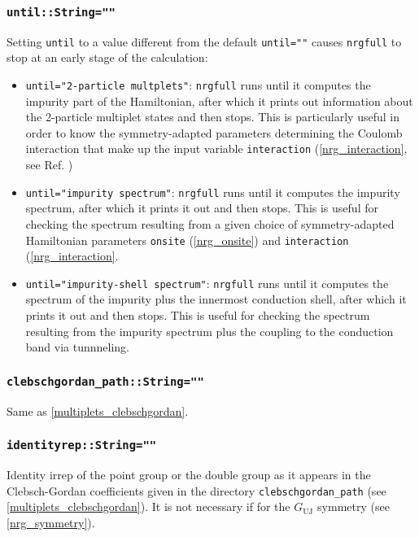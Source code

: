 \documentclass[notitlepage]{article}
\begin{document}
\subsubsection{\texttt{until::String=""}}
\label{nrg_until}
Setting \texttt{until} to a value different from the default
\texttt{until=""} causes \texttt{nrgfull} to stop at an
early stage of the calculation:
\begin{itemize}
    \item \texttt{until="2-particle multplets"}:
        \texttt{nrgfull} runs until it computes the impurity
        part of the Hamiltonian, after which it prints out
        information about the 2-particle multiplet states
        and then stops. This is particularly useful in order
        to know the symmetry-adapted parameters determining
        the Coulomb interaction that make up the input
        variable \texttt{interaction}
        (\ref{nrg_interaction}, see Ref.
        \cite{calvo-fernandez2024})
    \item \texttt{until="impurity spectrum"}:
        \texttt{nrgfull} runs until it computes the impurity
        spectrum, after which it prints it out and then
        stops. This is useful for checking the spectrum
        resulting from a given choice of symmetry-adapted
        Hamiltonian parameters \texttt{onsite}
        (\ref{nrg_onsite}) and \texttt{interaction}
        (\ref{nrg_interaction}.
    \item \texttt{until="impurity-shell spectrum"}:
        \texttt{nrgfull} runs until it computes the spectrum
        of the impurity plus the innermost conduction shell,
        after which it prints it out and then stops. This is
        useful for checking the spectrum resulting from the
        impurity spectrum plus the coupling to the
        conduction band via tunnneling.
\end{itemize}

\subsubsection{\texttt{clebschgordan\_path::String=""}}
Same as \ref{multiplets_clebschgordan}.

\subsubsection{\texttt{identityrep::String=""}}
\label{nrg_identityrep}
Identity irrep of the point group or the double group as it
appears in the Clebsch-Gordan coefficients given in the
directory \texttt{clebschgordan\_path} (see
\ref{multiplets_clebschgordan}). It is not necessary if for
the $G_\text{UJ}$ symmetry (see \ref{nrg_symmetry}).
\end{document}

